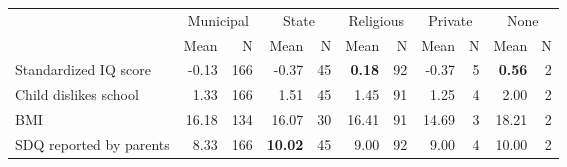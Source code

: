 \begin{tabular}{l r r r r r r r r r r}
\toprule
& \multicolumn{2}{c}{Municipal} & \multicolumn{2}{c}{State} & \multicolumn{2}{c}{Religious} & \multicolumn{2}{c}{Private} & \multicolumn{2}{c}{None} \\
& \scriptsize Mean & \scriptsize N & \scriptsize Mean & \scriptsize N & \scriptsize Mean & \scriptsize N & \scriptsize Mean & \scriptsize N & \scriptsize Mean & \scriptsize N \\
\midrule
Standardized IQ score &     -0.13 &       166 &     -0.37 &        45 & \textbf{     0.18} &        92 &     -0.37 &         5 & \textbf{     0.56} &         2 \\
Child dislikes school &      1.33 &       166 &      1.51 &        45 &      1.45 &        91 &      1.25 &         4 &      2.00 &         2 \\
BMI &     16.18 &       134 &     16.07 &        30 &     16.41 &        91 &     14.69 &         3 &     18.21 &         2 \\
SDQ reported by parents &      8.33 &       166 & \textbf{    10.02} &        45 &      9.00 &        92 &      9.00 &         4 &     10.00 &         2 \\
\bottomrule
\end{tabular}
